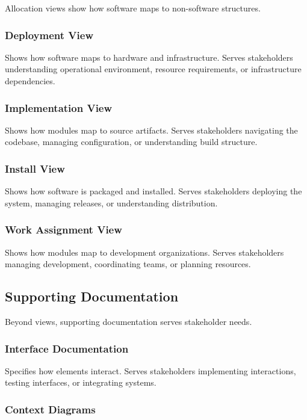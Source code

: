 \documentclass[11pt]{article}
\begin{document}
Allocation views show how software maps to non-software structures.

\subsubsection{Deployment View}

Shows how software maps to hardware and infrastructure. Serves stakeholders understanding operational environment, resource requirements, or infrastructure dependencies.

\subsubsection{Implementation View}

Shows how modules map to source artifacts. Serves stakeholders navigating the codebase, managing configuration, or understanding build structure.

\subsubsection{Install View}

Shows how software is packaged and installed. Serves stakeholders deploying the system, managing releases, or understanding distribution.

\subsubsection{Work Assignment View}

Shows how modules map to development organizations. Serves stakeholders managing development, coordinating teams, or planning resources.

\subsection{Supporting Documentation}

Beyond views, supporting documentation serves stakeholder needs.

\subsubsection{Interface Documentation}

Specifies how elements interact. Serves stakeholders implementing interactions, testing interfaces, or integrating systems.

\subsubsection{Context Diagrams}
\end{document}
